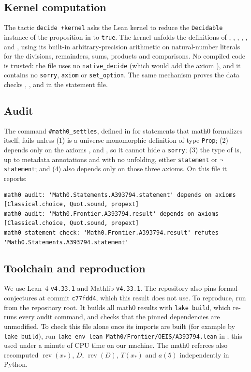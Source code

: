 \documentclass[11pt]{amsart}
\theoremstyle{plain}
\theoremstyle{definition}
\DeclareMathOperator{\rev}{rev}
\newcommand{\xs}{x_{\ast}}
\begin{document}
\subsection*{Kernel computation}
The tactic \texttt{decide +kernel} asks the Lean kernel to reduce the \texttt{Decidable} instance of the proposition in  to \texttt{true}. The kernel unfolds the definitions of , , , , ,  and , using its built-in arbitrary-precision arithmetic on natural-number literals for the divisions, remainders, sums, products and comparisons. No compiled code is trusted: the file uses no \texttt{native\_decide} (which would add the axiom ), and it contains no \texttt{sorry}, \texttt{axiom} or \texttt{set\_option}. The same mechanism proves the data checks , ,  and  in the statement file.

\subsection*{Audit}
The command \texttt{\#math0\_settles}, defined in  for statements that math0 formalizes itself, fails unless (1)  is a universe-monomorphic definition of type \texttt{Prop}; (2)  depends only on the axioms ,  and , so it cannot hide a \texttt{sorry}; (3) the type of  is, up to metadata annotations and with no unfolding, either \texttt{statement} or \texttt{¬ statement}; and (4)  also depends only on those three axioms. On this file it reports:
\begin{lstlisting}[basicstyle=\ttfamily\scriptsize]
math0 audit: 'Math0.Statements.A393794.statement' depends on axioms [Classical.choice, Quot.sound, propext]
math0 audit: 'Math0.Frontier.A393794.result' depends on axioms [Classical.choice, Quot.sound, propext]
math0 statement check: 'Math0.Frontier.A393794.result' refutes 'Math0.Statements.A393794.statement'
\end{lstlisting}

\subsection*{Toolchain and reproduction}
We use Lean~4 \cite{Lean4} \texttt{v4.33.1} and Mathlib \cite{Mathlib} \texttt{v4.33.1}. The repository also pins formal-conjectures \cite{FC} at commit \texttt{c77fdd4}, which this result does not use. To reproduce, run  from the repository root. It builds all math0 results with \texttt{lake build}, which re-runs every audit command, and checks that the pinned dependencies are unmodified. To check this file alone once its imports are built (for example by \texttt{lake build}), run \texttt{lake env lean Math0/Frontier/OEIS/A393794.lean} in ; this used under a minute of CPU time on our machine.
The math0 referees also recomputed $\rev(\xs)$, $D$, $\rev(D)$, $T(\xs)$ and $a(5)$ independently in Python.
\end{document}
